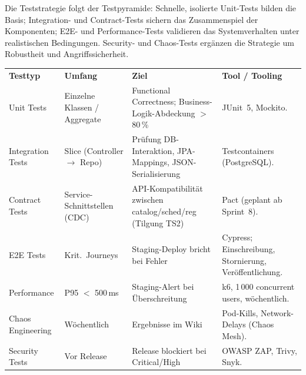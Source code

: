 Die Teststrategie folgt der Testpyramide: Schnelle, isolierte Unit-Tests bilden
die Basis; Integration- und Contract-Tests sichern das Zusammenspiel der
Komponenten; E2E- und Performance-Tests validieren das Systemverhalten unter
realistischen Bedingungen. Security- und Chaos-Tests ergänzen die Strategie
um Robustheit und Angriffssicherheit.

\begin{tabularx}{\textwidth}{L{2.2cm} L{2.5cm} X L{3.0cm}}
  \color{white}\textbf{Testtyp} & \color{white}\textbf{Umfang} & \color{white}\textbf{Ziel} & \color{white}\textbf{Tool / Tooling} \\
  Unit Tests & Einzelne Klassen / Aggregate & Functional Correctness; Business-Logik-Abdeckung $>$ 80\,\% & JUnit~5, Mockito. \\
  Integration Tests & Slice (Controller $\to$ Repo) & Prüfung DB-Interaktion, JPA-Mappings, JSON-Serialisierung & Testcontainers (PostgreSQL). \\
  Contract Tests & Service-Schnittstellen (CDC) & API-Kompatibilität zwischen catalog/sched/reg (Tilgung TS2) & Pact (geplant ab Sprint~8). \\
  E2E Tests & Krit.\ Journeys & Staging-Deploy bricht bei Fehler & Cypress; Einschreibung, Stornierung, Veröffentlichung. \\
  Performance & P95 $<$ 500\,ms & Staging-Alert bei Überschreitung & k6, 1\,000 concurrent users, wöchentlich. \\
  Chaos Engineering & Wöchentlich & Ergebnisse im Wiki & Pod-Kills, Network-Delays (Chaos Mesh). \\
  Security Tests & Vor Release & Release blockiert bei Critical/High & OWASP ZAP, Trivy, Snyk. \\
\end{tabularx}